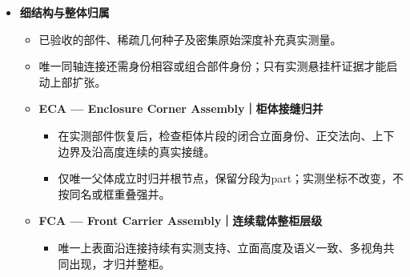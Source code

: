 \documentclass[UTF8,fontset=fandol]{ctexart}
\begin{document}
\begin{itemize}
\begin{itemize}
\begin{itemize}
\begin{itemize}
\item 逐像素真实深度、原生身份、平面和已有边界联合约束；三独立帧确认，不填造平面网格。

\end{itemize}

\item \textbf{OSL / ROS｜层架与房间外壳归属}


\begin{itemize}
\item OSL以多层支撑及面向相机的开放前侧分开架体与旁侧闭合面；仅有几何时保留原名称。


\item ROS识别最外层房间面，把重复贴合该面的根实例退回背景；其他物体点不移动。

\end{itemize}

\item 缓存身份种子提出局部平面，封闭立面与稀疏开放格架分开；前后边界及逐点多视角验收恢复漏掉的真实表面。

\end{itemize}

\item \textbf{细结构与整体归属}


\begin{itemize}
\item 已验收的部件、稀疏几何种子及密集原始深度补充真实测量。


\item 唯一同轴连接还需身份相容或组合部件身份；只有实测悬挂杆证据才能启动上部扩张。


\item \textbf{ECA — Enclosure Corner Assembly｜柜体接缝归并}


\begin{itemize}
\item 在实测部件恢复后，检查柜体片段的闭合立面身份、正交法向、上下边界及沿高度连续的真实接缝。


\item 仅唯一父体成立时归并根节点，保留分段为part；实测坐标不改变，不按同名或框重叠强并。

\end{itemize}

\item \textbf{FCA — Front Carrier Assembly｜连续载体整柜层级}


\begin{itemize}
\item 唯一上表面沿连接持续有实测支持、立面高度及语义一致、多视角共同出现，才归并整柜。



\end{itemize}
\end{itemize}
\end{itemize}
\end{itemize}
\end{document}
